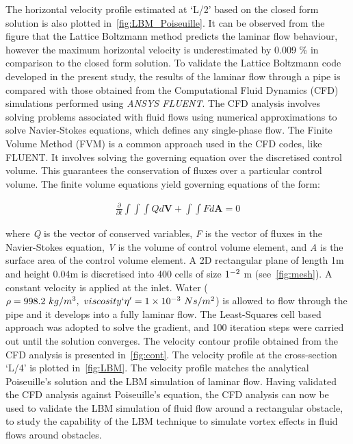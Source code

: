 The horizontal velocity profile estimated at `L/2' based on the closed form 
solution is also plotted in~\cref{fig:LBM_Poiseuille}. It can be observed from 
the figure that the Lattice Boltzmann method predicts the laminar flow 
behaviour, however the maximum horizontal velocity is underestimated by 0.009 
\% in comparison to the closed form solution. To validate the Lattice Boltzmann 
code developed in the present study, the results of the laminar flow through a 
pipe is compared with those obtained from the Computational Fluid Dynamics 
(CFD) simulations performed using \textit{ANSYS FLUENT}. The CFD analysis 
involves solving problems associated with fluid flows using numerical 
approximations to solve Navier-Stokes equations, which defines any single-phase 
flow. The Finite Volume Method (FVM) is a common approach used in the CFD 
codes, like FLUENT. It involves solving the governing equation over the 
discretised control volume. This guarantees the conservation of fluxes over a 
particular control volume. The finite volume equations yield governing 
equations of the form:

\begin{align}
\frac{\partial}{\partial t} \int\int\int  Q d\mathbf{V} + \int\int \mathit{F} d\mathbf{A} = 0
\end{align}

where \textit{Q} is the vector of conserved variables, \textit{F} is the vector 
of fluxes in the Navier-Stokes equation, \textit{V} is the volume of control 
volume element, and \textit{A} is the surface area of the control volume 
element. A 2D rectangular plane of length 1m and height 0.04m is discretised 
into 400 cells of size $1 \time 10^{-2} $ m (see~\cref{fig:mesh}). A constant 
velocity is applied at the inlet. Water ($\rho = 998.2\mbox{ }kg/m^{3},\mbox{ } 
viscosity`\eta'=1 \times 10^{-3}\mbox{ } Ns/m^{2} $) is allowed to flow through 
the pipe and it develops into a fully laminar flow. The Least-Squares cell 
based approach was adopted to solve the gradient, and 100 iteration steps were 
carried out until the solution converges. The velocity contour profile obtained 
from the CFD analysis is presented in~\cref{fig:cont}. The velocity profile at 
the cross-section `L/4' is plotted in~\cref{fig:LBM}. The velocity profile 
matches the analytical Poiseuille's solution and the LBM simulation of laminar 
flow. Having validated the CFD analysis against Poiseuille's equation, the CFD 
analysis can now be used to validate the LBM simulation of fluid flow around a 
rectangular obstacle, to study the capability of the LBM technique to simulate 
vortex effects in fluid flows around obstacles.

